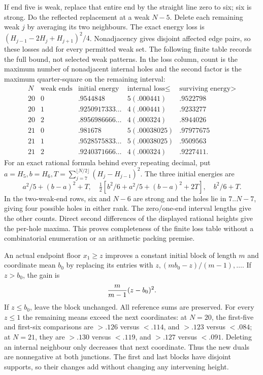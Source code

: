 If end five is weak, replace that entire end by the straight line
zero to six; six is strong. Do the reflected replacement at a weak
$N-5$. Delete each remaining weak $j$ by averaging its two neighbours.
The exact energy loss is
$(H_{j-1}-2H_j+H_{j+1})^2/4$. Nonadjacency gives disjoint affected
edge pairs, so these losses add for every permitted weak set.
The following finite table records the full bound, not selected weak
patterns. In the loss column, count is the maximum number of
nonadjacent internal holes and the second factor is the maximum
quarter-square on the remaining interval:
\[
\begin{array}{c|c|c|c|c}
N&\text{weak ends}&\text{initial energy}&\text{internal loss}\le&
 \text{surviving energy}>\\\hline
20&0&.9544848&5(.000441)&.9522798\\
20&1&.9250917333\ldots&4(.000441)&.9233277\\
20&2&.8956986666\ldots&4(.000324)&.8944026\\
21&0&.981678&5(.00038025)&.97977675\\
21&1&.9528575833\ldots&5(.00038025)&.9509563\\
21&2&.9240371666\ldots&4(.000324)&.9227411 .
\end{array}
\]
For an exact rational formula behind every repeating decimal, put
$a=H_5,b=H_6,T=\sum_{j=7}^{\lfloor N/2\rfloor}(H_j-H_{j-1})^2$.
The three initial energies are
\[
 a^2/5+(b-a)^2+T,\quad
 \tfrac12[b^2/6+a^2/5+(b-a)^2+2T],\quad b^2/6+T.
\]
In the two-weak-end rows, six and $N-6$ are strong and the holes
lie in $7..N-7$, giving four possible holes in either rank.
The zero/one-end interval lengths give the other counts. Direct
second differences of the displayed rational heights give the
per-hole maxima. This proves completeness of the finite loss table
without a combinatorial enumeration or an arithmetic packing premise.

An actual endpoint floor $x_1\ge z$ improves a constant initial
block of length $m$ and coordinate mean $b_0$ by replacing its
entries with $z,(mb_0-z)/(m-1),\ldots$. If $z>b_0$, the gain is
\[
 {m\over m-1}(z-b_0)^2.
\]
If $z\le b_0$, leave the block unchanged. All reference sums are
preserved. For every $z\le1$ the remaining means exceed the next
coordinates: at $N=20$, the first-five and first-six comparisons
are $>.126$ versus $<.114$, and $>.123$ versus $<.084$;
at $N=21$, they are $>.130$ versus $<.119$, and $>.127$ versus
$<.091$. Deleting an internal neighbour only decreases that next
coordinate. Thus the new duals are nonnegative at both junctions.
The first and last blocks have disjoint supports, so their changes
add without changing any intervening height.

